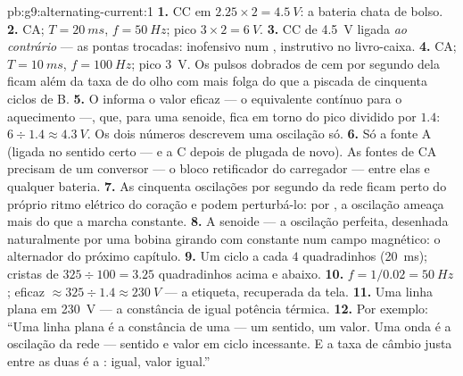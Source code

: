 \begin{solution}{pb:g9:alternating-current:1}
\textbf{1.} CC em $2.25 \times 2 = \qty{4.5}{V}$: a bateria chata de
bolso.
\textbf{2.} CA; $T = \qty{20}{ms}$, $f = \qty{50}{Hz}$; pico
$3 \times 2 = \qty{6}{V}$.
\textbf{3.} CC de \qty{4.5}{V} ligada \emph{ao contrário} --- as
pontas trocadas: inofensivo num , instrutivo no
livro-caixa.
\textbf{4.} CA; $T = \qty{10}{ms}$, $f = \qty{100}{Hz}$; pico
\qty{3}{V}. Os pulsos dobrados de cem por segundo dela ficam além da
taxa de  do olho com mais folga do que a piscada de cinquenta
ciclos de B.
\textbf{5.} O  informa o valor eficaz --- o equivalente
contínuo para o aquecimento ---, que, para uma senoide, fica em torno
do pico dividido por $1.4$: $6 \div 1.4 \approx \qty{4.3}{V}$. Os
dois números descrevem uma oscilação só.
\textbf{6.} Só a fonte A (ligada no sentido certo --- e a C depois de
plugada de novo). As fontes de CA precisam de um conversor --- o
bloco retificador do carregador --- entre elas e qualquer bateria.
\textbf{7.} As cinquenta oscilações por segundo da rede ficam perto
do próprio ritmo elétrico do coração e podem perturbá-lo:  por
, a oscilação ameaça mais do que a marcha constante.
\textbf{8.} A senoide --- a oscilação perfeita, desenhada
naturalmente por uma bobina girando com  constante num
campo magnético: o alternador do próximo capítulo.
\textbf{9.} Um ciclo a cada $4$ quadradinhos (\qty{20}{ms}); cristas
de $325 \div 100 = 3.25$ quadradinhos acima e abaixo.
\textbf{10.} $f = 1/0.02 = \qty{50}{Hz}$; eficaz
$\approx 325 \div 1.4 \approx \qty{230}{V}$ --- a etiqueta,
recuperada da tela.
\textbf{11.} Uma linha plana em \qty{230}{V} --- a constância de
igual potência térmica.
\textbf{12.} Por exemplo: ``Uma linha plana é a constância de uma
 --- um sentido, um valor. Uma onda é a oscilação da rede ---
sentido e valor em ciclo incessante. E a taxa de câmbio justa entre
as duas é a :  igual, valor igual.''
\end{solution}
